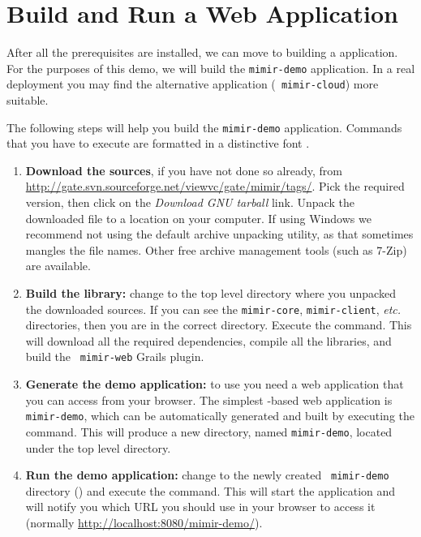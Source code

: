 \section{Build and Run a \Mimir{} Web Application}
%
After all the prerequisites are installed, we can move to building a \Mimir{}
application. For the purposes of this demo, we will build the {\tt mimir-demo}
application. In a real deployment you may find the alternative application ({\tt
mimir-cloud}) more suitable.

The following steps will help you build the {\tt mimir-demo} application.
Commands that you have to execute are formatted in a distinctive font
.
\begin{enumerate}
  \item {\bf Download the \Mimir{} sources}, if you have not done so already,
  from \url{http://gate.svn.sourceforge.net/viewvc/gate/mimir/tags/}. Pick the
  required version, then click on the {\em Download GNU tarball} link. Unpack
  the downloaded file to a location on your computer. If using Windows we
  recommend not using the default archive unpacking utility, as that sometimes
  mangles the file names. Other free archive management tools (such as 7-Zip)
  are available.
  \item {\bf Build the library:} change to the top level directory where you
  unpacked the downloaded \Mimir{} sources. If you can see the {\tt mimir-core},
  {\tt mimir-client}, {\em etc.} directories, then you are in the correct
  directory. Execute the  command. This will download all the
  required dependencies, compile all the \Mimir{} libraries, and build the {\tt
  mimir-web} Grails plugin.
  \item {\bf Generate the demo application:} to use \Mimir{} you need a web
  application that you can access from your browser. The simplest \Mimir{}-based
  web application is {\tt mimir-demo}, which can be automatically generated
  and built by executing the  command. This will produce a
  new directory, named {\tt mimir-demo}, located under the top level \Mimir{}
  directory.
  \item {\bf Run the demo application:}  change to the newly created {\tt
  mimir-demo} directory () and execute the  command. This will start the application and will notify you which
  URL you should use in your browser to access it (normally
  \url{http://localhost:8080/mimir-demo/}).
\end{enumerate}
%
